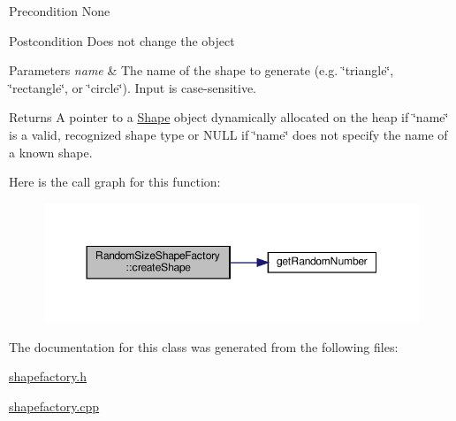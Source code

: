 \begin{DoxyPrecond}{Precondition}
None 
\end{DoxyPrecond}
\begin{DoxyPostcond}{Postcondition}
Does not change the object 
\end{DoxyPostcond}

\begin{DoxyParams}{Parameters}
{\em name} & The name of the shape to generate (e.\+g. \char`\"{}triangle\char`\"{}, \char`\"{}rectangle\char`\"{}, or \char`\"{}circle\char`\"{}). Input is case-\/sensitive. \\
\hline
\end{DoxyParams}
\begin{DoxyReturn}{Returns}
A pointer to a \hyperlink{class_shape}{Shape} object dynamically allocated on the heap if \char`\"{}name\char`\"{} is a valid, recognized shape type or N\+U\+LL if \char`\"{}name\char`\"{} does not specify the name of a known shape. 
\end{DoxyReturn}


Here is the call graph for this function\+:
\nopagebreak
\begin{figure}[H]
\begin{center}
\leavevmode
\includegraphics[width=350pt]{class_random_size_shape_factory_aebd390118a1e8874fc7f2e8c5a62a627_cgraph}
\end{center}
\end{figure}




The documentation for this class was generated from the following files\+:\begin{DoxyCompactItemize}
\item 
\hyperlink{shapefactory_8h}{shapefactory.\+h}\item 
\hyperlink{shapefactory_8cpp}{shapefactory.\+cpp}\end{DoxyCompactItemize}
